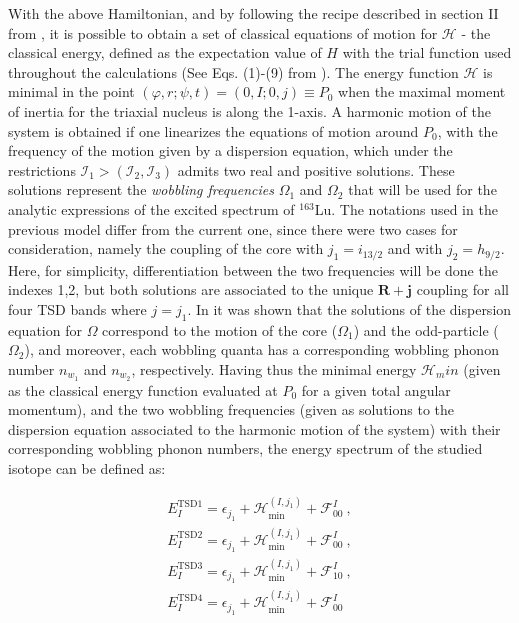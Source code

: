 \documentclass[%
 reprint,
 amsmath,
 amssymb,
 aps,
]{revtex4-2}
\begin{document}
With the above Hamiltonian, and by following the recipe described in section II from \cite{raduta2020new}, it is possible to obtain a set of classical equations of motion for $\mathcal{H}$ - the classical energy, defined as the expectation value of $H$ with the trial function used throughout the calculations (See Eqs. (1)-(9) from \cite{raduta2020new}). The energy function $\mathcal{H}$ is minimal in the point $(\varphi,r;\psi,t)=(0,I;0,j)\equiv P_0$ when the maximal moment of inertia for the triaxial nucleus is along the 1-axis. A harmonic motion of the system is obtained if one linearizes the equations of motion around $P_0$, with the frequency of the motion given by a dispersion equation, which under the restrictions $\mathcal{I}_1>(\mathcal{I}_2,\mathcal{I_3})$ admits two real and positive solutions. These solutions represent the \emph{wobbling frequencies} $\Omega_1$ and $\Omega_2$ that will be used for the analytic expressions of the excited spectrum of $^{163}$Lu. The notations used in the previous model differ from the current one, since there were two cases for consideration, namely the coupling of the core with $j_1=i_{13/2}$ and with $j_2=h_{9/2}$. Here, for simplicity, differentiation between the two frequencies will be done the indexes 1,2, but both solutions are associated to the unique $\mathbf{R}+\mathbf{j}$ coupling for all four TSD bands where $j=j_1$. In \cite{raduta2017semiclassical} it was shown that the solutions of the dispersion equation for $\Omega$ correspond to the motion of the core ($\Omega_1$) and the odd-particle ($\Omega_2$), and moreover, each wobbling quanta has a corresponding wobbling phonon number $n_{w_1}$ and $n_{w_2}$, respectively. Having thus the minimal energy $\mathcal{H}_min$ (given as the classical energy function evaluated at $P_0$ for a given total angular momentum), and the two wobbling frequencies (given as solutions to the dispersion equation associated to the harmonic motion of the system) with their corresponding wobbling phonon numbers, the energy spectrum of the studied isotope can be defined as:

\begin{align}
    E_I^\text{TSD1}=\epsilon_{j_1} + \mathcal{H}_\text{min}^{(I,j_1)}+\mathcal{F}_{00}^I \nonumber\ ,\\
    E_I^\text{TSD2}=\epsilon_{j_1} + \mathcal{H}_\text{min}^{(I,j_1)}+\mathcal{F}_{00}^I \nonumber\ ,\\
    E_I^\text{TSD3}=\epsilon_{j_1} + \mathcal{H}_\text{min}^{(I,j_1)}+\mathcal{F}_{10}^I \nonumber\ ,\\
    E_I^\text{TSD4}=\epsilon_{j_1} + \mathcal{H}_\text{min}^{(I,j_1)}+\mathcal{F}_{00}^I \label{wobbling_energies}
\end{align}
\end{document}
